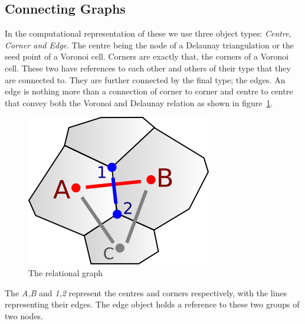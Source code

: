 \documentclass[11pt,a4paper,twocolumn]{article}
\begin{document}
\subsection{Connecting Graphs} \label{sec:connectinggraphs}
In the computational representation of these we use three object types: \emph{Centre, Corner and Edge}. The centre being the node of a Delaunay triangulation or the seed point of a Voronoi cell. Corners are exactly that, the corners of a Voronoi cell. These two have references to each other and others of their type that they are connected to. They are further connected by the final type; the edges. An edge is nothing more than a connection of corner to corner and centre to centre that convey both the Voronoi and Delaunay relation as shown in figure~\ref{fig:relation}.
\begin{figure}[h]
	\centering
	\includegraphics[scale=0.75]{images/edge-duality.png}
	\caption{The relational graph\cite{patel}}\label{fig:relation}
\end{figure}
The \emph{A,B} and \emph{1,2} represent the centres and corners respectively, with the lines representing their edges. The edge object holds a reference to these two groups of two nodes. 
\end{document}
